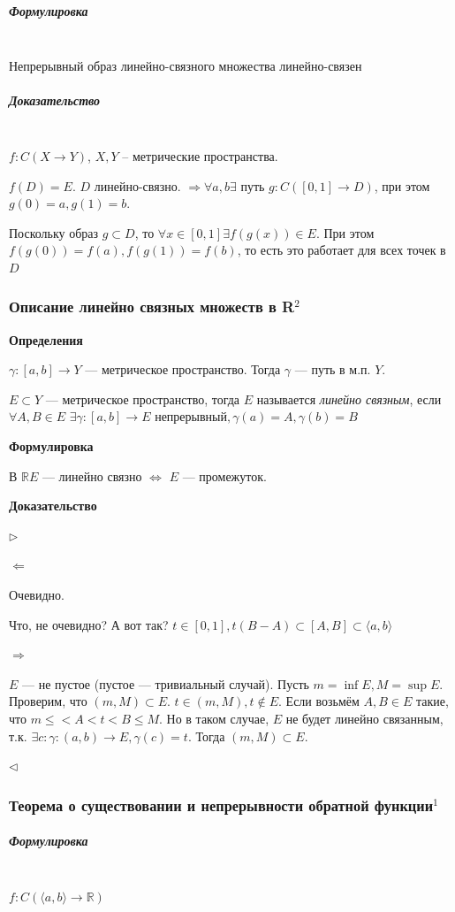 \documentclass{article}
\def\dbl{\,\,}
\let\vanillasubparagraph\subparagraph
\renewcommand{\subparagraph}[1]{\vanillasubparagraph{#1}\mbox{}\\}
\begin{document}
\subparagraph{Формулировка}
Непрерывный образ линейно-связного множества линейно-связен

\subparagraph{Доказательство}
$f: C(X \rightarrow Y)$, $X, Y$ -- метрические пространства.

$f(D) = E$. $D$ линейно-связно. $\Rightarrow \forall a, b \exists $ путь $g : C([0, 1] \rightarrow D)$, при этом $g(0) = a, g(1) = b$. 

Поскольку образ $g \subset D$, то $\forall x \in [0, 1] \exists f(g(x)) \in E$. При этом $f(g(0)) = f(a), f(g(1)) = f(b)$, то есть это работает для всех точек в $D$ 


\subsubsection{Описание линейно связных множеств в R\texorpdfstring{$^2$}{}}

\textbf{Определения}

$\gamma: [a, b] \rightarrow Y$ --- метрическое пространство. Тогда $\gamma$ --- путь в м.п. $Y$.

$E \subset Y$ --- метрическое пространство, тогда $E$ называется \textit{линейно связным}, если $\forall A, B \in E \dbl \exists \gamma: [a, b] \rightarrow E \text{ непрерывный}, \gamma(a) = A, \gamma(b) = B$

\textbf{Формулировка}

В $\mathbb{R} E$ --- линейно связно $\Leftrightarrow$ $E$ --- промежуток.

\textbf{Доказательство}

$\rhd$

$\Leftarrow$

Очевидно.

Что, не очевидно? А вот так? $t \in [0, 1], t(B - A) \subset [A, B] \subset \langle a, b \rangle$

$\Rightarrow$

$E$ --- не пустое (пустое --- тривиальный случай). Пусть $m = \inf E, M = \sup E$. Проверим, что $(m, M) \subset E$. $t \in (m, M), t \notin E$. Если возьмём $A, B \in E$ такие, что $m \le < A < t < B \le M$. Но в таком случае, $E$ не будет линейно связанным, т.к. $\exists c : \gamma: (a, b) \rightarrow E, \gamma(c) = t$. Тогда $(m , M) \subset E$.

$\lhd$


\subsubsection{Теорема о существовании и непрерывности обратной функции\texorpdfstring{$^1$}{}}
\subparagraph{Формулировка}
$f: C(\langle a, b \rangle \rightarrow \mathbb{R})$
\end{document}
